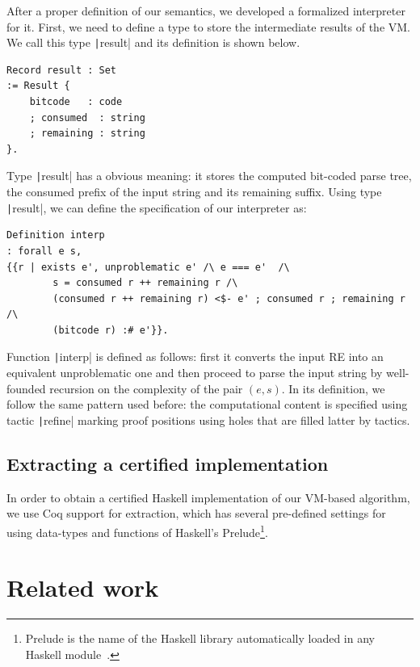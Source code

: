 \documentclass[oneside,12pt]{scrbook}
\theoremstyle{definition}
\newcommand{\coq}[1]{\texttt|#1|}
\theoremstyle{plain}
\theoremstyle{definition}
\begin{document}
After a proper definition of our semantics, we developed a formalized
interpreter for it. First, we need to define a type to store the
intermediate results of the VM. We call this type \coq{result} and its
definition is shown below.
\begin{verbatim}
Record result : Set
:= Result {
	bitcode   : code
	; consumed  : string  
	; remaining : string
}.
\end{verbatim} 
Type \coq{result} has a obvious meaning: it stores the computed bit-coded parse
tree, the consumed prefix of the input string and its remaining suffix. Using
type \coq{result}, we can define the specification of our interpreter as:
\begin{verbatim}
Definition interp
: forall e s,
{{r | exists e', unproblematic e' /\ e === e'  /\
		s = consumed r ++ remaining r /\
		(consumed r ++ remaining r) <$- e' ; consumed r ; remaining r /\
		(bitcode r) :# e'}}. 
\end{verbatim}
Function \coq{interp} is defined as follows: first it converts the input RE into
an equivalent unproblematic one and then proceed to parse the input string by
well-founded recursion on the complexity of the pair $(e,s)$. In its definition,
we follow the same pattern used before: the computational content is specified
using tactic \coq{refine} marking proof positions using holes that are filled
latter by tactics.

\section{Extracting a certified implementation}

In order to obtain a certified Haskell implementation of our VM-based algorithm,
we use Coq support for extraction, which has several pre-defined
settings for using data-types and functions of Haskell's
Prelude\footnote{Prelude is the name of the Haskell library automatically loaded
in any Haskell module~\cite{Haskell98}.}.


\chapter{Related work}\label{section:relatedwork}
\end{document}
